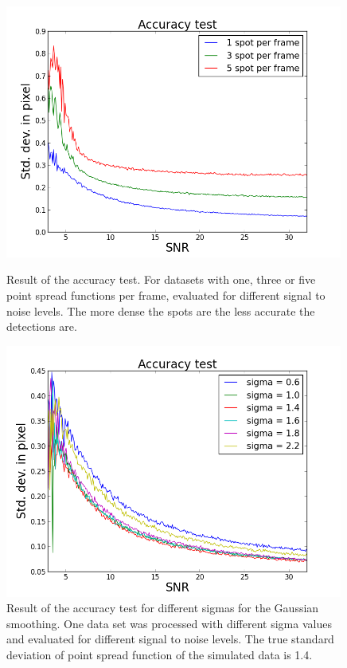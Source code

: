 \begin{figure}
\begin{minipage}[t]{0.48\textwidth}
\includegraphics[width = 0.99\textwidth]{pictures/AccuracyTest.png}
	\caption{Result of the accuracy test. For datasets with one, three or five point spread functions per frame, evaluated for different signal to noise levels. The more dense the spots are the less accurate the detections are.}
	\label{accplot}	
\end{minipage}\hfill
\begin{minipage}[t]{0.48\textwidth}
\centering
\includegraphics[width = 0.99\textwidth]{pictures/AccuracyTestSigma.png}
	\caption{Result of the accuracy test for different sigmas for the Gaussian smoothing. One data set was processed with different sigma values and evaluated for different signal to noise levels. The true standard deviation of point spread function of the simulated data is 1.4.}
	\label{accplot2}

\end{minipage}
\end{figure}


